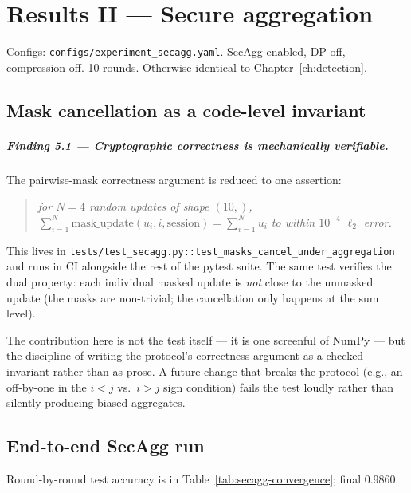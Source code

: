 \documentclass[11pt,a4paper]{report}
\begin{document}
\chapter{Results II --- Secure aggregation}\label{ch:secagg}

Configs: \texttt{configs/experiment\_secagg.yaml}. SecAgg enabled,
DP off, compression off. 10 rounds. Otherwise identical to
Chapter~\ref{ch:detection}.

\section{Mask cancellation as a code-level invariant}\label{sec:f5.1}

\paragraph{Finding 5.1 --- Cryptographic correctness is mechanically
verifiable.} The pairwise-mask correctness argument
\cite{bonawitz2017secagg} is reduced to one assertion:
\begin{quote}\itshape
  for $N=4$ random updates of shape $(10,)$,
  $\sum_{i=1}^{N}\mathrm{mask\_update}(u_i, i, \mathrm{session}) =
   \sum_{i=1}^{N} u_i$ to within $10^{-4}$ $\ell_2$ error.
\end{quote}
This lives in
\texttt{tests/test\_secagg.py::test\_masks\_cancel\_under\_aggregation} and
runs in CI alongside the rest of the pytest suite. The same test verifies
the dual property: each individual masked update is \emph{not} close to the
unmasked update (the masks are non-trivial; the cancellation only happens
at the sum level).

The contribution here is not the test itself --- it is one screenful of
NumPy --- but the discipline of writing the protocol's correctness argument
as a checked invariant rather than as prose. A future change that breaks the
protocol (e.g., an off-by-one in the $i < j$ vs.\ $i > j$ sign condition)
fails the test loudly rather than silently producing biased aggregates.

\section{End-to-end SecAgg run}\label{sec:f5.2}

Round-by-round test accuracy is in Table~\ref{tab:secagg-convergence};
final 0.9860.
\end{document}
